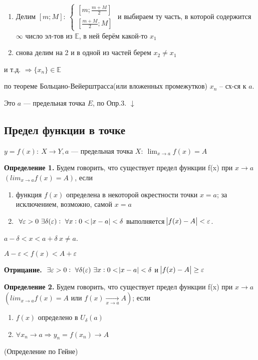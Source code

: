 \documentclass{article}
\begin{document}
  \begin{enumerate}
      \item Делим \([m; M]:\ \begin{cases}[m; \frac{m+M}{2}]\\ [\frac{m+M}{2}; M]\end{cases}\)
      и выбираем ту часть, в которой содержится \(\infty\) число эл-тов из \(\mathbb{E}\), в ней берём какой-то \(x_1\)
      \item снова делим на 2 и в одной из частей берем \(x_2 \neq x_1\)
  \end{enumerate}
  и т.д. \(\Rightarrow \{x_n\} \in \mathbb{E}\)

  по теореме Больцано-Вейерштрасса(или вложенных промежутков) \(x_n\) -- сх-ся к \(a\).

  Это \(a\) --- предельная точка \(E\), по Опр.3.
  \(\downarrow\)

  \subsection{Предел функции в точке}

  \(y=f(x):\ X \rightarrow Y, a\) --- предельная точка \(X:\ \lim_{x \rightarrow a}{f(x)} = A\)

  \textbf{Определение 1.} Будем говорить, что существует предел функции f(x) при \(x \rightarrow a\) \( (lim_{x\rightarrow a} f(x) = A) \), если

  \begin{enumerate}
      \item функция \(f(x)\) определена в некоторой окрестности точки \(x=a\); за исключением, возможно, самой \(x=a\)
      \item \(\ \forall \varepsilon > 0\ \exists \delta(\varepsilon):\ \forall x: 0 < \abs{x - a} < \delta\) выполняется \(\abs{f(x) - A} < \varepsilon\).
  \end{enumerate}
  \(a - \delta < x < a + \delta\ x \neq a\).

  \(A - \varepsilon < f(x) < A + \varepsilon\)

  \textbf{Отрицание.} \(\ \exists \varepsilon > 0:\ \forall \delta(\varepsilon)\ \exists x: 0 < \abs{x - a} < \delta\) и \(\abs{f(x) - A} \geq \varepsilon\)

  \textbf{Определение 2.} Будем говорить, что существует предел функции f(x) при \(x \rightarrow a\) \( (lim_{x\rightarrow a} f(x) = A \textrm{ или } f(x) \xrightarrow[x \rightarrow a]{} A)\); если

  \begin{enumerate}
    \item \(f(x)\) определено в \(U_\delta(a)\)
    \item \(\forall x_n \rightarrow a \Rightarrow y_n = f(x_n)\rightarrow A\)
  \end{enumerate}
  (Определение по Гейне)
\end{document}
